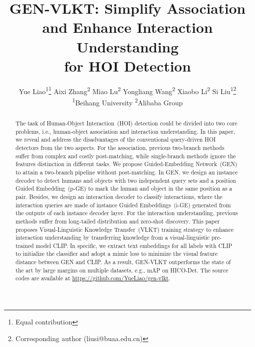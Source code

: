 \documentclass[10pt,twocolumn,letterpaper]{article}
\makeatletter
\newcommand{\printfnsymbol}[1]{\textsuperscript{\@fnsymbol{#1}}}
\makeatother
\begin{document}
\title{GEN-VLKT: Simplify Association and Enhance Interaction Understanding \\ for HOI Detection}

\author{  
  Yue Liao\textsuperscript{\rm 1}\thanks{Equal contribution} \quad Aixi Zhang\textsuperscript{\rm 2}\printfnsymbol{1} \quad Miao Lu\textsuperscript{\rm 2} \quad Yongliang Wang\textsuperscript{\rm 2} \quad Xiaobo Li\textsuperscript{\rm 2}  \quad Si Liu\textsuperscript{\rm 1}\thanks{Corresponding author (liusi@buaa.edu.cn)} \\

   \textsuperscript{\rm 1}Beihang University \quad
  \textsuperscript{\rm 2}Alibaba Group 
}
\maketitle

\begin{abstract}
The task of Human-Object Interaction~(HOI) detection could be divided into two core problems, i.e., human-object association and interaction understanding. In this paper, we reveal and address the disadvantages of the conventional query-driven HOI detectors from the two aspects.
For the association, previous two-branch methods suffer from complex and costly post-matching, while single-branch methods ignore the features distinction in different tasks. We propose Guided-Embedding Network~(GEN) to attain a two-branch pipeline without post-matching. In GEN, we design an instance decoder to detect humans and objects with two independent query sets and a position Guided Embedding~(p-GE) to mark the human and object in the same position as a pair. Besides, we design an interaction decoder to classify interactions, where the interaction queries are made of instance Guided Embeddings~(i-GE) generated from the outputs of each instance decoder layer.
For the interaction understanding, previous methods suffer from long-tailed distribution and zero-shot discovery. This paper proposes Visual-Linguistic Knowledge Transfer~(VLKT) training strategy to enhance interaction understanding by transferring knowledge from a visual-linguistic pre-trained model CLIP.  In specific, we extract text embeddings for all labels with CLIP to initialize the classifier and adopt a mimic loss to minimize the visual feature distance between GEN and CLIP. As a result, GEN-VLKT outperforms the state of the art by large margins on multiple datasets, e.g.,  mAP on HICO-Det. The source codes are available at \url{https://github.com/YueLiao/gen-vlkt}.
\end{abstract}
\end{document}
